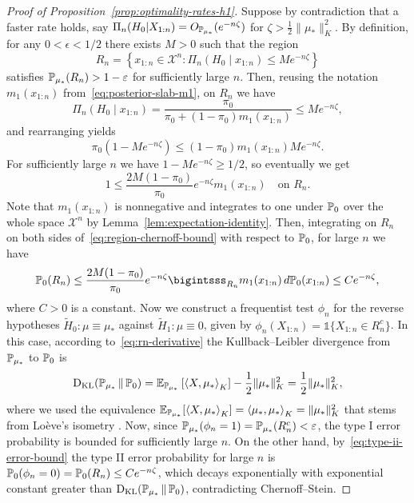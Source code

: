 \begin{proof}[Proof of Proposition~\ref{prop:optimality-rates-h1}]\label{proof:optimality-rates-h1}
  Suppose by contradiction that a faster rate holds, say \(\Pi_n(H_0|X_{1:n})=O_{\mathbb{P}_{\mu_*}}(e^{-n\zeta})\) for \(\zeta > \frac{1}{2}\|\mu_*\|_K^2\). By definition, for any \(0<\epsilon<1/2\) there exists \(M>0\) such that the region
  \[
  R_n = \left\{x_{1:n} \in \mathcal{X}^n: \Pi_n(H_0\mid x_{1:n}) \leq M e^{-n\zeta}\right\}
  \]
  satisfies \(\mathbb{P}_{\mu_*}(R_n)> 1-\varepsilon\) for sufficiently large \(n\). Then, reusing the notation \(m_1(x_{1:n})\) from~\eqref{eq:posterior-slab-m1}, on \(R_n\) we have 
  \[
  \Pi_n(H_0\mid x_{1:n}) = \frac{\pi_0}{\pi_0 + (1-\pi_0)m_1(x_{1:n})} \leq M e^{-n\zeta},
  \]
  and rearranging yields
  \[
  \pi_0(1-M e^{-n\zeta}) \leq (1-\pi_0)m_1(x_{1:n}) M e^{-n\zeta}.
  \]
  For sufficiently large \(n\) we have \(1-M e^{-n\zeta} \geq 1/2\), so eventually we get
  \begin{equation}\label{eq:region-chernoff-bound}
  1\leq \frac{2M(1-\pi_0)}{\pi_0} e^{-n\zeta} m_1(x_{1:n})\quad \text{on } R_n.
  \end{equation}
  Note that \(m_1(x_{1:n})\) is nonnegative and integrates to one under \(\mathbb{P}_0\) over the whole space \(\mathcal X^n\) by Lemma~\ref{lem:expectation-identity}. Then, integrating on \(R_n\) on both sides of~\eqref{eq:region-chernoff-bound} with respect to \(\mathbb{P}_0\), for large \(n\) we have
  \begin{equation}\label{eq:type-ii-error-bound}
  \pp_0(R_n) \leq \frac{2M(1-\pi_0)}{\pi_0} e^{-n\zeta} \bigintsss_{R_n} m_1(x_{1:n})\, d\pp_0(x_{1:n}) \leq C e^{-n\zeta},
  \end{equation}
  where \(C>0\) is a constant. Now we construct a frequentist test \(\phi_n\) for the reverse hypotheses \(\tilde{H}_0: \mu\equiv \mu_*\) against \(\tilde{H}_1: \mu\equiv 0\), given by \(\phi_n(X_{1:n}) = \mathds{1}\{X_{1:n} \in R_n^c\}\). In this case, according to~\eqref{eq:rn-derivative} the Kullback--Leibler divergence from \(\mathbb{P}_{\mu_*}\) to \(\mathbb{P}_0\) is
  \[
  \operatorname{D_{KL}}(\mathbb{P}_{\mu_*} \,\|\, \mathbb{P}_0) = \mathbb{E}_{\mathbb{P}_{\mu_*}}\left[\left\langle X,\mu_*\right\rangle_K\right] - \frac{1}{2}\|\mu_*\|^2_K = \frac{1}{2}\|\mu_*\|_K^2,
  \]
  where we used the equivalence \(\mathbb{E}_{\mathbb{P}_{\mu_*}}[\left\langle X,\mu_*\right\rangle_K]=\left\langle\mu_*,\mu_*\right\rangle_K=\|\mu_*\|_K^2\) that stems from Loève's isometry \citep[p.~974]{parzen1961approach}. Now, since \(\mathbb{P}_{\mu_*}(\phi_n = 1)=\mathbb{P}_{\mu_*}(R_n^c) < \varepsilon\), the type I error probability is bounded for sufficiently large \(n\). On the other hand, by~\eqref{eq:type-ii-error-bound} the type II error probability for large \(n\) is \(\mathbb{P}_0(\phi_n=0)=\mathbb{P}_0(R_n)\leq C e^{-n\zeta}\), which decays exponentially with exponential constant greater than \(\operatorname{D_{KL}}(\mathbb{P}_{\mu_*} \,\|\, \mathbb{P}_0)\), contradicting Chernoff--Stein.
\end{proof}


